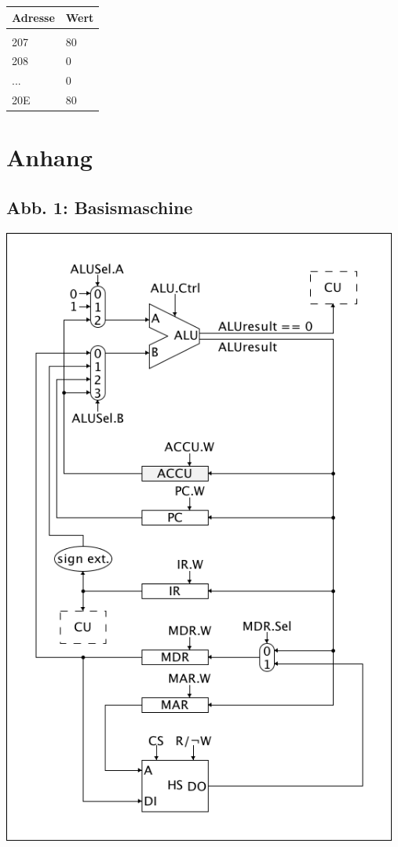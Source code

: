 \documentclass[12pt,titlepage]{article}
\begin{document}
\begin{table}[h!]
    \begin{tabular}{l|l}
    Adresse & Wert            \\
    \hline                    \\
    207   & 80       \\
    208   & 0        \\
    ...   & 0        \\
    20E   & 80       \\
    \end{tabular}
\end{table}

\newpage

\section{Anhang}

\subsection{Abb. 1: Basismaschine}
\includegraphics[width=13cm]{schematics.png}
\end{document}
